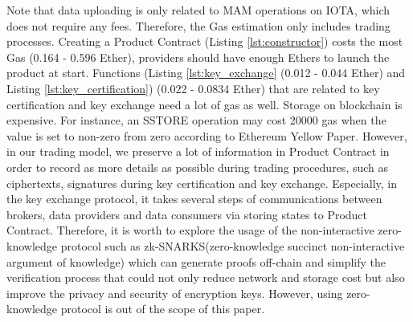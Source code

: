 \documentclass[conference]{IEEEtran}
\begin{document}
\begin{table}[h]
	\caption{Gas consumption for each function of Product Contract}
	\label{tab:gas}
\end{table}

Note that data uploading is only related to MAM operations on IOTA, which does not require any fees. Therefore, the Gas estimation only includes trading processes. Creating a Product Contract (Listing \ref{lst:constructor}) costs the most Gas (0.164 - 0.596 Ether), providers should have enough Ethers to launch the product at start. Functions (Listing \ref{lst:key_exchange} (0.012 - 0.044 Ether) and Listing \ref{lst:key_certification}) (0.022 - 0.0834 Ether) that are related to key certification and key exchange need a lot of gas as well. Storage on blockchain is expensive. For instance, an SSTORE operation may cost 20000 gas when the value is set to non-zero from zero according to Ethereum Yellow Paper\cite{Ethereum}. However, in our trading model, we preserve a lot of information in Product Contract in order to record as more details as possible during trading procedures, such as ciphertexts,  signatures during key certification and key exchange. Especially, in the key exchange protocol, it takes several steps of communications between brokers, data providers and data consumers via storing states to Product Contract. Therefore, it is worth to explore the usage of the non-interactive zero-knowledge protocol such as zk-SNARKS(zero-knowledge succinct non-interactive argument of knowledge)\cite{Snark} which can generate proofs off-chain and simplify the verification process that could not only reduce network and storage cost but also improve the privacy and security of encryption keys. However, using zero-knowledge protocol is out of the scope of this paper.
\end{document}
